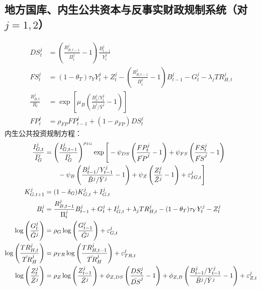 \documentclass[12pt,UTF8]{ctexart}
\begin{document}
	\subsection{地方国库、内生公共资本与反事实财政规制系统（对 $j=1,2$）}
	\begin{align}
		DS_t^j &=\left(\frac{R_{B,t-1}^j}{\Pi_t^j}-1\right)\frac{B_{t-1}^j}{Y_t^j} \label{a27}\\
		FS_t^j &=(1-\theta_T)\tau_Y Y_t^j+Z_t^j -\left(\frac{R_{B,t-1}^j}{\Pi_t^j}-1\right)B_{t-1}^j-G_t^j-\lambda_jTR_{H,t}^j \label{a28}\\
		\frac{R_{B,t}^j}{R_t} &=\exp\left[\mu_B\left(\frac{B_t^j/Y_t^j}{\bar B^j/\bar Y^j}-1\right)\right] \label{a29}\\
		FP_t^j &=\rho_{FP}FP_{t-1}^j+(1-\rho_{FP})DS_t^j \label{a30}
	\end{align}
	内生公共投资规制方程：
	\begin{align}
		\frac{I_{G,t}^j}{\bar I_G^j} &=\left(\frac{I_{G,t-1}^j}{\bar I_G^j}\right)^{\rho_{IG}} \exp\Bigg[ -\psi_{DS}\left(\frac{FP_t^j}{\bar{FP}^j}-1\right) +\psi_{FS}\left(\frac{FS_t^j}{\bar{FS}^j}-1\right)\notag\\ &\qquad -\psi_B\left(\frac{B_{t-1}^j/Y_{t-1}^j}{\bar B^j/\bar Y^j}-1\right) +\psi_Z\left(\frac{Z_t^j}{\bar Z^j}-1\right) +\varepsilon_{IG,t}^j \Bigg] \label{a31}\\
		K_{G,t+1}^j &=(1-\delta_G)K_{G,t}^j+I_{G,t}^j \label{a32}\\
		B_t^j &=\frac{R_{B,t-1}^j}{\Pi_t^j}B_{t-1}^j +G_t^j+I_{G,t}^j+\lambda_jTR_{H,t}^j -(1-\theta_T)\tau_Y Y_t^j-Z_t^j \label{a33}\\
		\log\left(\frac{G_t^j}{\bar G^j}\right) &=\rho_G\log\left(\frac{G_{t-1}^j}{\bar G^j}\right)+\varepsilon_{G,t}^j \label{a34}\\
		\log\left(\frac{TR_{H,t}^j}{\bar{TR}_H^j}\right) &=\rho_{TR}\log\left(\frac{TR_{H,t-1}^j}{\bar{TR}_H^j}\right)+\varepsilon_{TR,t}^j \label{a35}\\
		\log\left(\frac{Z_t^j}{\bar Z^j}\right) &=\rho_Z\log\left(\frac{Z_{t-1}^j}{\bar Z^j}\right) +\phi_{Z,DS}\left(\frac{DS_t^j}{\bar{DS}^j}-1\right) +\phi_{Z,B}\left(\frac{B_{t-1}^j/Y_{t-1}^j}{\bar B^j/\bar Y^j}-1\right)+\varepsilon_{Z,t}^j \label{a36}
	\end{align}
	
\end{document}
